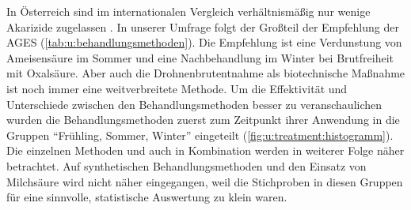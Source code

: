 In Österreich sind im internationalen Vergleich verhältnismäßig nur wenige Akarizide zugelassen \citep{brodschneider2019}. In unserer Umfrage folgt der Großteil der Empfehlung der AGES \citep{moosbeckhofer2015} (\cref{tab:u:behandlungsmethoden}). Die Empfehlung ist eine Verdunstung von Ameisensäure im Sommer und eine Nachbehandlung im Winter bei Brutfreiheit mit Oxalsäure. Aber auch die Drohnenbrutentnahme als biotechnische Maßnahme ist noch immer eine weitverbreitete Methode. Um die Effektivität und Unterschiede zwischen den Behandlungsmethoden besser zu veranschaulichen wurden die Behandlungsmethoden zuerst zum Zeitpunkt ihrer Anwendung in die Gruppen \enquote{Frühling, Sommer, Winter} eingeteilt (\cref{fig:u:treatment:histogramm}).
\\
Die einzelnen Methoden und auch in Kombination werden in weiterer Folge näher betrachtet. 
Auf synthetischen Behandlungsmethoden und den Einsatz von Milchsäure wird nicht näher eingegangen, weil die Stichproben in diesen Gruppen für eine sinnvolle, statistische Auswertung zu klein waren.


